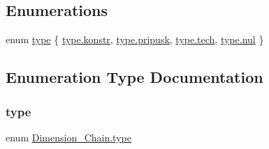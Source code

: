\subsection*{Enumerations}
\begin{DoxyCompactItemize}
\item 
enum \mbox{\hyperlink{namespace_dimension___chain_a6ec9051138598c61cc00acf2547dced4}{type}} \{ \mbox{\hyperlink{namespace_dimension___chain_a6ec9051138598c61cc00acf2547dced4a86476dc11574d5a7c834b43c2b3cb307}{type.\+konstr}}, 
\mbox{\hyperlink{namespace_dimension___chain_a6ec9051138598c61cc00acf2547dced4a7d5fd127b63e3b749194757afe78502e}{type.\+pripusk}}, 
\mbox{\hyperlink{namespace_dimension___chain_a6ec9051138598c61cc00acf2547dced4ad9f9133fb120cd6096870bc2b496805b}{type.\+tech}}, 
\mbox{\hyperlink{namespace_dimension___chain_a6ec9051138598c61cc00acf2547dced4a40a8712b29ac76182ed0c4f632b7d543}{type.\+nul}}
 \}
\end{DoxyCompactItemize}


\subsection{Enumeration Type Documentation}
\mbox{\label{namespace_dimension___chain_a6ec9051138598c61cc00acf2547dced4}} 
\subsubsection{\texorpdfstring{type}{type}}
{\footnotesize\ttfamily enum \mbox{\hyperlink{namespace_dimension___chain_a6ec9051138598c61cc00acf2547dced4}{Dimension\+\_\+\+Chain.\+type}}\hspace{0.3cm}{\ttfamily [strong]}}

